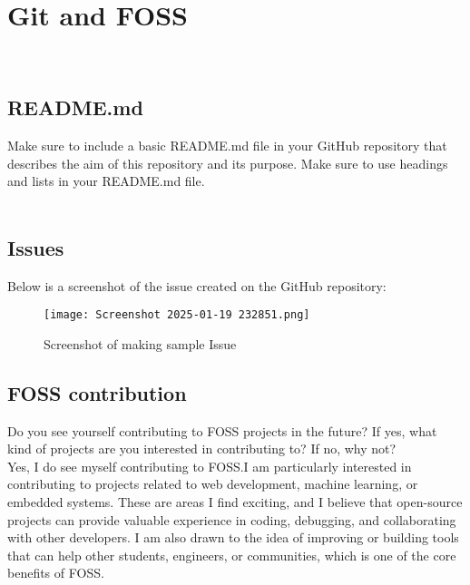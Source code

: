 \documentclass[a4paper,12pt]{article}
\begin{document}
\clearpage
\section{Git and FOSS}
\\
\subsection{README.md}
Make sure to include a basic README.md file in your GitHub repository that describes
the aim of this repository and its purpose.
Make sure to use headings and lists in your README.md file.
\\
\\
\subsection{Issues}
Below is a screenshot of the issue created on the GitHub repository:
\begin{figure}[h!]
    \centering
    \texttt{[image: Screenshot 2025-01-19 232851.png]} 
    \caption{Screenshot of making sample Issue}
\end{figure}

\clearpage
\subsection{FOSS contribution}
Do you see yourself contributing to FOSS projects in the future? If yes, what kind of
projects are you interested in contributing to? If no, why not?
\\Yes, I do see myself contributing to FOSS.I am particularly interested in contributing to projects related to web development, machine learning, or embedded systems. These are areas I find exciting, and I believe that open-source projects can provide valuable experience in coding, debugging, and collaborating with other developers. I am also drawn to the idea of improving or building tools that can help other students, engineers, or communities, which is one of the core benefits of FOSS.
\end{document}
